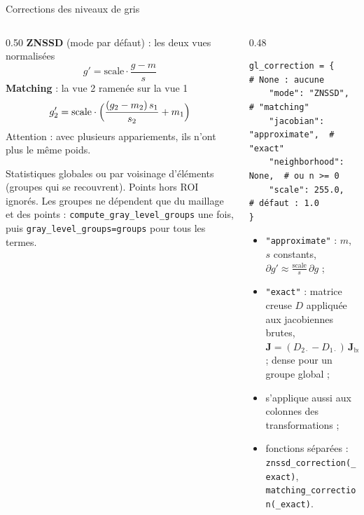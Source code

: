 \documentclass[aspectratio=169,11pt]{beamer}
\newcommand{\code}[1]{\texttt{\small #1}}
\begin{document}
\begin{frame}[fragile]{Corrections des niveaux de gris}
  \begin{columns}[T]
    \begin{column}{0.50\textwidth}\footnotesize
      \textbf{ZNSSD} (mode par défaut) : les deux vues normalisées
      \[
        g' = \text{scale}\cdot\frac{g - m}{s}
      \]
      \textbf{Matching} : la vue 2 ramenée sur la vue 1
      \[
        g_2' = \text{scale}\cdot\Bigl(\frac{(g_2 - m_2)\,s_1}{s_2} + m_1\Bigr)
      \]
      \textcolor{pyred}{Attention :} avec plusieurs appariements, ils n'ont plus le
      même poids.
 
      \smallskip
      Statistiques globales ou par \alert{voisinage} d'éléments (groupes qui se
      recouvrent). Points hors ROI ignorés. Les groupes ne dépendent que du maillage
      et des points : \texttt{compute\_gray\_level\_groups} \alert{une fois}, puis
      \texttt{gray\_level\_groups=groups} pour tous les termes.
    \end{column}
    \begin{column}{0.48\textwidth}
\begin{lstlisting}[basicstyle=\ttfamily\tiny]
gl_correction = {           # None : aucune
    "mode": "ZNSSD",       # "matching"
    "jacobian": "approximate",  # "exact"
    "neighborhood": None,  # ou n >= 0
    "scale": 255.0,        # défaut : 1.0
}
\end{lstlisting}
      \footnotesize
      \begin{itemize}
        \item \code{"approximate"} : $m$, $s$ constants,
              $\partial g' \approx \tfrac{\text{scale}}{s}\,\partial g$ ;
        \item \code{"exact"} : matrice creuse $D$ appliquée aux jacobiennes brutes,
              $\mathbf{J} = (D_{2\cdot} - D_{1\cdot})\,\mathbf{J}_{\text{brut}}$ ;
              dense pour un groupe global ;
        \item s'applique aussi aux colonnes des transformations ;
        \item fonctions séparées : \code{znssd\_correction(\_exact)},
              \code{matching\_correction(\_exact)}.
      \end{itemize}
    \end{column}
  \end{columns}
\end{frame}
\end{document}
